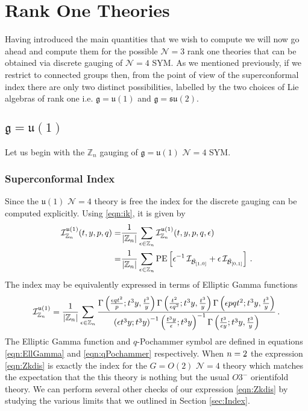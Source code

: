 \documentclass[main.tex]{subfiles}
\begin{document}
\section{Rank One Theories}\label{sec:rank1}
Having introduced the main quantities that we wish to compute we will now go ahead and compute them for the possible $\mathcal{N}=3$ rank one theories that can be obtained via discrete gauging of $\mathcal{N}=4$ SYM. As we mentioned previously, if we restrict to connected groups then, from the point of view of the superconformal index there are only two distinct possibilities, labelled by the two choices of Lie algebras of rank one i.e. $\mathfrak{g}=\mathfrak{u}(1)$ and $\mathfrak{g}=\mathfrak{su}(2)$.
\subsection{\texorpdfstring{$\mathfrak{g}=\mathfrak{u}(1)$}{g=u(1)}}
Let us begin with the $\mathbb{Z}_n$ gauging of $\mathfrak{g}=\mathfrak{u}(1)$ $\mathcal{N}=4$ SYM. 
\subsubsection{Superconformal Index}
Since the $\mathfrak{u}(1)$ $\mathcal{N}=4$ theory is free the index for the discrete gauging can be computed explicitly. Using \eqref{eqn:ik}, it is given by 
\begin{equation}\label{eqn:Zkdis}
\begin{aligned}
\mathcal{I}^{\mathfrak{u}(1)}_{\mathbb{Z}_{n}}(t,y,p,q)=&\frac{1}{|\mathbb{Z}_{n}|}\sum_{\epsilon\in \mathbb{Z}_{n}}\mathcal{I}^{\mathfrak{u}(1)}_{\mathbb{Z}_{n}}(t,y,p,q,\epsilon)\\
=&\frac{1}{|\mathbb{Z}_{n}|}\sum_{\epsilon\in \mathbb{Z}_{n}}\operatorname{\mathrm{PE}}\left[\epsilon^{-1}\,\mathcal{I}_{\hat{\mathcal{B}}_{[1,0]}
}+\epsilon\,\mathcal{I}_{\hat{\mathcal{B}}_{[0,1]}}\right]\, .
\end{aligned}
\end{equation}
The index may be equivalently expressed in terms of Elliptic Gamma functions  \cite{Dolan:2008qi}
\begin{equation}
\mathcal{I}^{\mathfrak{u}(1)}_{\mathbb{Z}_{n}}=\frac{1}{|\mathbb{Z}_{n}|}\sum_{\epsilon\in\mathbb{Z}_{n}}\frac{\Gamma\left(\frac{\epsilon qt^2}{p};t^3y,\frac{t^3}{y}\right)\Gamma\left(\frac{t^2}{\epsilon q^2};t^3y,\frac{t^3}{y}\right)\Gamma\left(\epsilon pqt^2;t^3y,\frac{t^3}{y}\right)}{\left(\epsilon t^3y;t^3y\right)^{-1}\left(\frac{t^3y}{\epsilon };t^3y\right)^{-1}\Gamma\left(\frac{t^3}{\epsilon y};t^3y,\frac{t^3}{y}\right)}\,.
\label{eqn:u1index}
\end{equation}
The Elliptic Gamma function and $q$-Pochammer symbol are defined in equations \eqref{eqn:EllGamma} and \eqref{eqn:qPochammer} respectively.
When $n=2$ the expression \eqref{eqn:Zkdis} is exactly the index for the $G=O(2)$ $\mathcal{N}=4$ theory which matches the expectation that the this theory is nothing but the usual $O3^-$ orientifold theory. 
We can perform several other checks of our expression \eqref{eqn:Zkdis} by studying the various limits that we outlined in Section \ref{sec:Index}.
\end{document}
